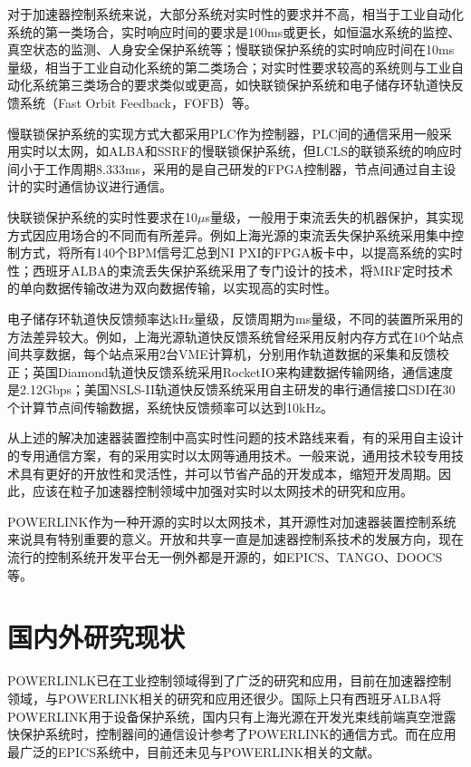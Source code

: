 对于加速器控制系统来说，大部分系统对实时性的要求并不高，相当于工业自动化系统的第一类场合，实时响应时间的要求是100ms或更长，如恒温水系统的监控、真空状态的监测、人身安全保护系统等；慢联锁保护系统的实时响应时间在10ms量级，相当于工业自动化系统的第二类场合；对实时性要求较高的系统则与工业自动化系统第三类场合的要求类似或更高，如快联锁保护系统和电子储存环轨道快反馈系统（Fast Orbit Feedback，FOFB）等。

慢联锁保护系统的实现方式大都采用PLC作为控制器，PLC间的通信采用一般采用实时以太网，如ALBA和SSRF的慢联锁保护系统\cite{Alba-eps,yu2020}，但LCLS的联锁系统的响应时间小于工作周期8.333ms，采用的是自己研发的FPGA控制器，节点间通过自主设计的实时通信协议进行通信\cite{Norum-2009}。

快联锁保护系统的实时性要求在10$\mu$s量级，一般用于束流丢失的机器保护，其实现方式因应用场合的不同而有所差异。例如上海光源的束流丢失保护系统采用集中控制方式，将所有140个BPM信号汇总到NI PXI的FPGA板卡中，以提高系统的实时性\cite{SSRF}；西班牙ALBA的束流丢失保护系统采用了专门设计的技术，将MRF定时技术的单向数据传输改进为双向数据传输，以实现高的实时性\cite{Alba-eps}。


电子储存环轨道快反馈频率达kHz量级，反馈周期为ms量级，不同的装置所采用的方法差异较大。例如，上海光源轨道快反馈系统曾经采用反射内存方式在10个站点间共享数据，每个站点采用2台VME计算机，分别用作轨道数据的采集和反馈校正\cite{SSRF}；英国Diamond轨道快反馈系统采用RocketIO来构建数据传输网络，通信速度是2.12Gbps\cite{DIAMOND-FOFB}；美国NSLS-II轨道快反馈系统采用自主研发的串行通信接口SDI在30个计算节点间传输数据，系统快反馈频率可以达到10kHz\cite{NSLS-II-FOFB}。

从上述的解决加速器装置控制中高实时性问题的技术路线来看，有的采用自主设计的专用通信方案\cite{Norum-2009}，有的采用实时以太网等通用技术\cite{Alba-eps}。一般来说，通用技术较专用技术具有更好的开放性和灵活性，并可以节省产品的开发成本，缩短开发周期。因此，应该在粒子加速器控制领域中加强对实时以太网技术的研究和应用。

POWERLINK作为一种开源的实时以太网技术，其开源性对加速器装置控制系统来说具有特别重要的意义。开放和共享一直是加速器控制系技术的发展方向，现在流行的控制系统开发平台无一例外都是开源的，如EPICS、TANGO、DOOCS等\cite{TANGO,DOOCS}。

\section{国内外研究现状}
POWERLINLK已在工业控制领域得到了广泛的研究和应用\cite{xu-2015,zhu-2014,shi-2012,huang-2012,Seno-2007,cena-2009}，目前在加速器控制领域，与POWERLINK相关的研究和应用还很少。国际上只有西班牙ALBA将POWERLINK用于设备保护系统，国内只有上海光源在开发光束线前端真空泄露快保护系统时，控制器间的通信设计参考了POWERLINK的通信方式。而在应用最广泛的EPICS系统中，目前还未见与POWERLINK相关的文献。

